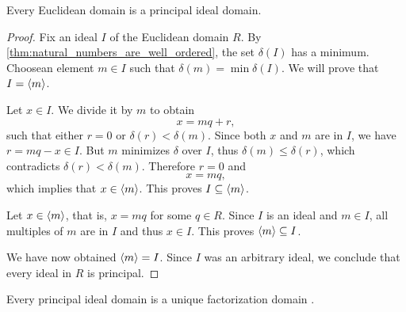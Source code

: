 \begin{proposition}\label{thm:euclidean_domain_is_pid}
  Every Euclidean domain is a principal ideal domain.
\end{proposition}
\begin{proof}
  Fix an ideal \( I \) of the Euclidean domain \( R \). By \cref{thm:natural_numbers_are_well_ordered}, the set \( \delta(I) \) has a minimum. Choose\AOC an element \( m \in I \) such that \( \delta(m) = \min \delta(I) \). We will prove that \( I = \left\langle m \right\rangle \).

  Let \( x \in I \). We divide it by \( m \) to obtain
  \begin{equation*}
    x = mq + r,
  \end{equation*}
  such that either \( r = 0 \) or \( \delta(r) < \delta(m) \). Since both \( x \) and \( m \) are in \( I \), we have \( r = mq - x \in I \). But \( m \) minimizes \( \delta \) over \( I \), thus \( \delta(m) \leq \delta(r) \), which contradicts \( \delta(r) < \delta(m) \). Therefore \( r = 0 \) and
  \begin{equation*}
    x = mq,
  \end{equation*}
  which implies that \( x \in \left\langle m \right\rangle \). This proves \( I \subseteq \left\langle m \right\rangle \).

  Let \( x \in \left\langle m \right\rangle \), that is, \( x = mq \) for some \( q \in R \). Since \( I \) is an ideal and \( m \in I \), all multiples of \( m \) are in \( I \) and thus \( x \in I \). This proves \( \left\langle m \right\rangle \subseteq I \).

  We have now obtained \( \left\langle m \right\rangle = I \). Since \( I \) was an arbitrary ideal, we conclude that every ideal in \( R \) is principal.
\end{proof}

\begin{proposition}\label{thm:pid_is_ufd}
  Every principal ideal domain is a unique factorization domain .
\end{proposition}

